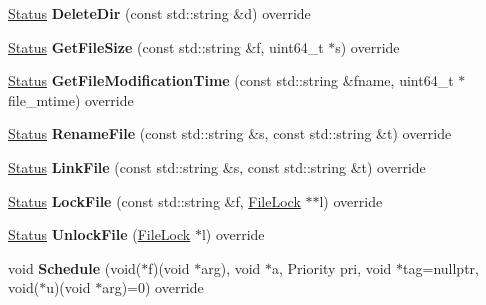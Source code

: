 \begin{DoxyCompactItemize}
\item 
\hyperlink{classrocksdb_1_1Status}{Status} {\bfseries Delete\+Dir} (const std\+::string \&d) override\hypertarget{classrocksdb_1_1EnvWrapper_a671abf270a42b060531a33e57e6dda44}{}\label{classrocksdb_1_1EnvWrapper_a671abf270a42b060531a33e57e6dda44}

\item 
\hyperlink{classrocksdb_1_1Status}{Status} {\bfseries Get\+File\+Size} (const std\+::string \&f, uint64\+\_\+t $\ast$s) override\hypertarget{classrocksdb_1_1EnvWrapper_a2b10a24c1394464ce2a0d56d29a1a03c}{}\label{classrocksdb_1_1EnvWrapper_a2b10a24c1394464ce2a0d56d29a1a03c}

\item 
\hyperlink{classrocksdb_1_1Status}{Status} {\bfseries Get\+File\+Modification\+Time} (const std\+::string \&fname, uint64\+\_\+t $\ast$file\+\_\+mtime) override\hypertarget{classrocksdb_1_1EnvWrapper_a4e1147d6136e86eb0d082525839c1575}{}\label{classrocksdb_1_1EnvWrapper_a4e1147d6136e86eb0d082525839c1575}

\item 
\hyperlink{classrocksdb_1_1Status}{Status} {\bfseries Rename\+File} (const std\+::string \&s, const std\+::string \&t) override\hypertarget{classrocksdb_1_1EnvWrapper_a1d027dd3537ba577893df70232c35763}{}\label{classrocksdb_1_1EnvWrapper_a1d027dd3537ba577893df70232c35763}

\item 
\hyperlink{classrocksdb_1_1Status}{Status} {\bfseries Link\+File} (const std\+::string \&s, const std\+::string \&t) override\hypertarget{classrocksdb_1_1EnvWrapper_a35951d75c25be92c096d426e616dd670}{}\label{classrocksdb_1_1EnvWrapper_a35951d75c25be92c096d426e616dd670}

\item 
\hyperlink{classrocksdb_1_1Status}{Status} {\bfseries Lock\+File} (const std\+::string \&f, \hyperlink{classrocksdb_1_1FileLock}{File\+Lock} $\ast$$\ast$l) override\hypertarget{classrocksdb_1_1EnvWrapper_a3864487300905a1dc31172530b0d68a9}{}\label{classrocksdb_1_1EnvWrapper_a3864487300905a1dc31172530b0d68a9}

\item 
\hyperlink{classrocksdb_1_1Status}{Status} {\bfseries Unlock\+File} (\hyperlink{classrocksdb_1_1FileLock}{File\+Lock} $\ast$l) override\hypertarget{classrocksdb_1_1EnvWrapper_af4ed5505a79bf2469aee41b071e65772}{}\label{classrocksdb_1_1EnvWrapper_af4ed5505a79bf2469aee41b071e65772}

\item 
void {\bfseries Schedule} (void($\ast$f)(void $\ast$arg), void $\ast$a, Priority pri, void $\ast$tag=nullptr, void($\ast$u)(void $\ast$arg)=0) override\hypertarget{classrocksdb_1_1EnvWrapper_a4dcc1d168f1a6313df4c0272259d7dce}{}\label{classrocksdb_1_1EnvWrapper_a4dcc1d168f1a6313df4c0272259d7dce}


\end{DoxyCompactItemize}
